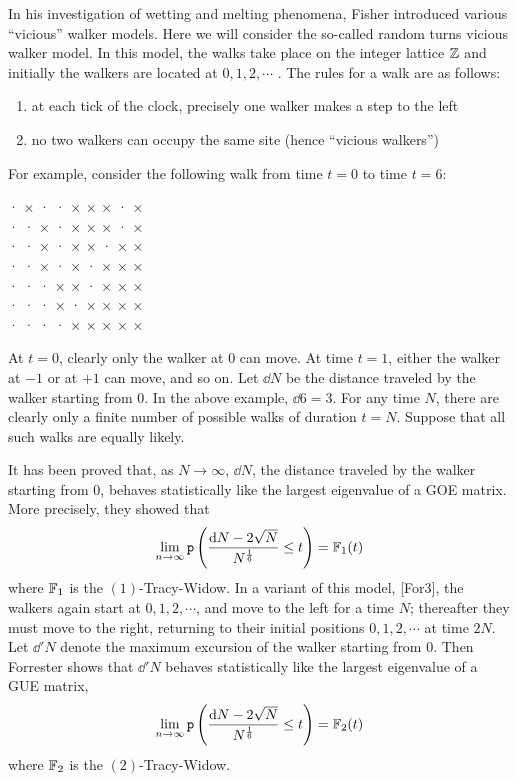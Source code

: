 In his investigation of wetting and melting phenomena, Fisher introduced various “vicious” walker models. Here we will consider the so-called random turns vicious walker model. In this model, the walks take place on the integer lattice $\mathbb{Z}$ and initially the walkers are located at $0, 1, 2, \cdots$ . The rules for a walk are as follows:
\begin{enumerate}
 \item at each tick of the clock, precisely one walker makes a step to the left
 \item no two walkers can occupy the same site (hence “vicious walkers”)
\end{enumerate}
For example, consider the following walk from time $t = 0$ to time $t = 6$:
\begin{center}
	· × · · × × × · × \\
	· · × · × × × · × \\
	· · × · × × · × × \\
	· · × · × · × × × \\
	· · · × × · × × × \\
	· · · × · × × × × \\
	· · · · × × × × × \\
\end{center}
At $t = 0$, clearly only the walker at $0$ can move. At time $t = 1$, either the walker at $-1$ or at $+1$ can move, and so on. Let $\dd N$ be the distance traveled by the walker starting from $0$. In the above example, $\dd 6 = 3$. For any time $N$, there are clearly only a finite number of possible walks of duration $t = N$. Suppose that all such walks are equally likely.

It has been proved that, as $N \rightarrow \infty$, $\dd N$, the distance traveled by
the walker starting from $0$, behaves statistically like the largest eigenvalue of a GOE
matrix. More precisely, they showed that
\begin{equation}
	\lim_{n\rightarrow \infty} \mathtt{p}\left( \frac{\mathrm{d} N - 2 \sqrt{N}}{N^{\frac{1}{6}}} \leq t \right) = \mathbb{F}_{1}(t)
\end{equation}
where $\mathbb{F}_1$ is the $(1)$-Tracy-Widow. In a variant of this model, [For3], the walkers again start at $0,1,2,\cdots$, and move to the left for a time $N$; thereafter they must move to the
right, returning to their initial positions $0,1,2,\cdots$ at time $2N$. Let $\dd'N$ denote the
maximum excursion of the walker starting from $0$. Then Forrester shows that $\dd'N$ behaves statistically like the largest eigenvalue of a GUE matrix,
\begin{equation}
	\lim_{n\rightarrow \infty} \mathtt{p}\left( \frac{\mathrm{d} N - 2 \sqrt{N}}{N^{\frac{1}{6}}} \leq t \right) = \mathbb{F}_{2}(t)
\end{equation}
where $\mathbb{F}_2$ is the $(2)$-Tracy-Widow.

